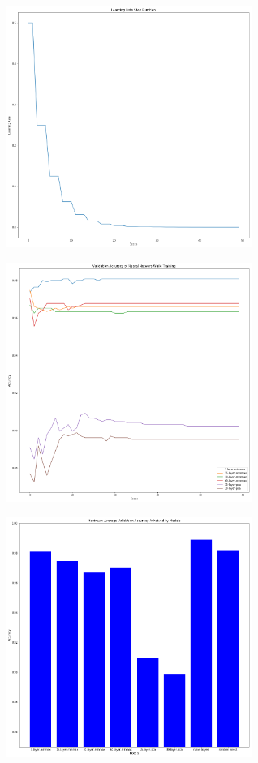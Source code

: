 \documentclass[a4paper,11pt]{article}
\begin{document}
\begin{figure}
\centering
\includegraphics[width=8cm]{Step_function}
\caption{}
\label{fig-4}
\end{figure}
\begin{figure}
\centering
\includegraphics[width=8cm]{Training}
\caption{}
\label{fig-5}
\end{figure}
\begin{figure}
\centering
\includegraphics[width=8cm]{Accuracy}
\caption{}
\label{fig-6}
\end{figure}
\end{document}
